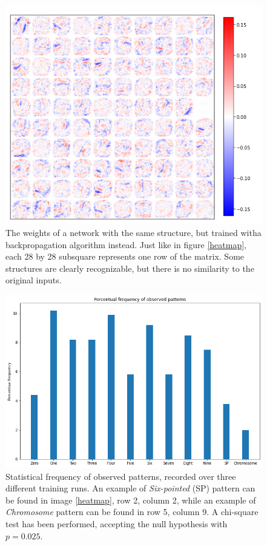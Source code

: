 \documentclass[a4paper]{report}
\begin{document}
\begin{figure} [H]
    \centering
    \includegraphics [width = 12cm] {h/backnet.png}
    \caption{The weights of a network with the same structure, but trained witha backpropagation algorithm instead. Just like in figure \ref{heatmap}, each 28 by 28 subsquare represents one row of the matrix.
    Some structures are clearly recognizable, but there is no similarity to the original inputs.}
    \label{backnet}
\end{figure}

\begin{figure} [H]
    \centering
    \includegraphics [width=12cm ] {o/bar2.png}
    \caption{Statistical frequency of observed patterns, recorded over three different training runs. An example of \textit{Six-pointed} (SP) pattern can be found in image \ref{heatmap}, row 2, column 2, while an example of \textit{Chromosome} pattern can be found in row 5, column 9. A chi-square test has been performed, accepting the null hypothesis with $p =0.025$.}
    \label{ii_hist}
\end{figure}
\end{document}
